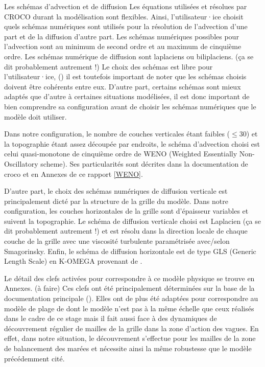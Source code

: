 \documentclass[10pt,a4paper,titlepage]{article}
\begin{document}
\begin{codeEnv}{Les schémas d'advection et de diffusion}
    Les équations utilisées et résolues par CROCO durant la modélisation sont flexibles.
    Ainsi, l'utilisateur·ice choisit quels schémas numériques sont utilisés pour la résolution de l'advection d'une part et de la diffusion d'autre part.
    Les schémas numériques possibles pour l'advection sont au minimum de second ordre et au maximum de cinquième ordre.
    Les schémas numérique de diffusion sont laplaciens ou biliplaciens. (ça se dit probablement autrement !)
    Le choix des schémas est libre pour l'utilisateur·ice, (\cite{schemas_advection}) il est toutefois important de noter que les schémas choisis doivent être cohérents entre eux.
    D'autre part, certains schémas sont mieux adaptés que d'autre à certaines situations modélisées, il est donc important de bien comprendre sa configuration avant de choisir les schémas numériques que le modèle doit utiliser.

    Dans notre configuration, le nombre de couches verticales étant faibles ($\leq 30$) et la topographie étant assez découpée par endroits, le schéma d'advection choisi est celui quasi-monotone de cinquième ordre de WENO (Weighted Essentially Non-Oscillatory scheme).
    Ses particularités sont décrites dans la documentation de croco et en Annexes de ce rapport \ref{WENO}.

    D'autre part, le choix des schémas numériques de diffusion verticale est principalement dicté par la structure de la grille du modèle.
    Dans notre configuration, les couches horizontales de la grille sont d'épaisseur variables et suivent la topographie.
    Le schéma de diffusion verticale choisi est Laplacien (ça se dit probablement autrement !) et est résolu dans la direction locale de chaque couche de la grille avec une viscosité turbulente paramétrisée avec/selon Smagorinsky.
    Enfin, le schéma de diffusion horizontale est de type GLS (Generic Length Scale) en K-OMEGA provenant de \cite{GLS_KOMEGA_kolmogorov1941equations}.
\end{codeEnv}

Le détail des clefs activées pour correspondre à ce modèle physique se trouve en Annexes. (à faire)
Ces clefs ont été principalement déterminées sur la base de la documentation principale (\cite{cppkeys_description}).
Elles ont de plus été adaptées pour correspondre au modèle de plage de \cite{swash_article_MARCHESIELLO2021101816} dont le modèle n'est pas à la même échelle que ceux réalisés dans le cadre de ce stage mais il fait aussi face à des dynamiques de découvrement régulier de mailles de la grille dans la zone d'action des vagues.
En effet, dans notre situation, le découvrement s'effectue pour les mailles de la zone de balancement des marées et nécessite ainsi la même robustesse que le modèle précédemment cité.
\end{document}
